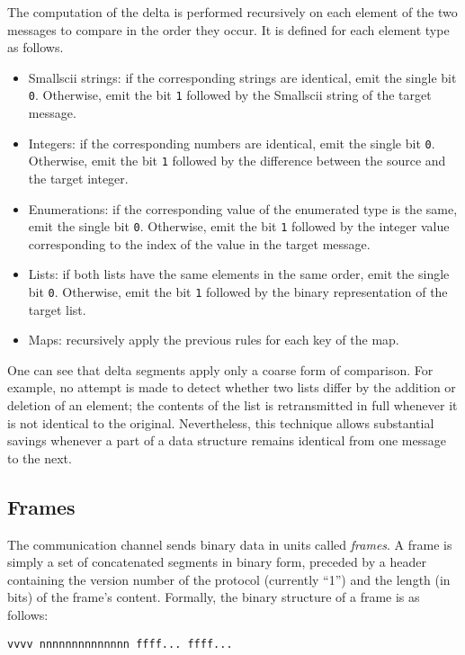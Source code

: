 The computation of the delta is performed recursively on each element of the two messages to compare in the order they occur. It is defined for each element type as follows.

\begin{itemize}
\item Smallscii strings: if the corresponding strings are identical, emit the single bit \verb+0+. Otherwise, emit the bit \verb+1+ followed by the Smallscii string of the target message.
%
\item Integers: if the corresponding numbers are identical, emit the single bit \verb+0+. Otherwise, emit the bit \verb+1+ followed by the difference between the source and the target integer.
%
\item Enumerations: if the corresponding value of the enumerated type is the same, emit the single bit \verb+0+. Otherwise, emit the bit \verb+1+ followed by the integer value corresponding to the index of the value in the target message.
%
\item Lists: if both lists have the same elements in the same order, emit the single bit \verb+0+. Otherwise, emit the bit \verb+1+ followed by the binary representation of the target list.
%
\item Maps: recursively apply the previous rules for each key of the map.
\end{itemize}

One can see that delta segments apply only a coarse form of comparison. For example, no attempt is made to detect whether two lists differ by the addition or deletion of an element; the contents of the list is retransmitted in full whenever it is not identical to the original. Nevertheless, this technique allows substantial savings whenever a part of a data structure remains identical from one message to the next.

\subsection{Frames}
\setcounter{paragraph}{0}

The communication channel sends binary data in units called \emph{frames}. A frame is simply a set of concatenated segments in binary form, preceded by a header containing the version number of the protocol (currently ``1'') and the length (in bits) of the frame's content. Formally, the binary structure of a frame is as follows:

\begin{verbatim}
vvvv nnnnnnnnnnnnnn ffff... ffff...
\end{verbatim}

